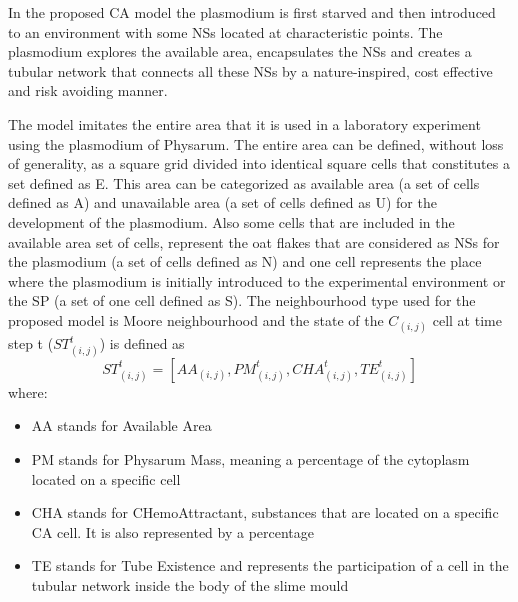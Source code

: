 In the proposed CA model \cite{Tsompanas2016} the plasmodium is first starved and then introduced to an environment with some NSs located at characteristic points. The plasmodium explores the available area, encapsulates the NSs and creates a tubular network that connects all these NSs by a nature-inspired, cost effective and risk avoiding manner.
\par
The model imitates the entire area that it is used in a laboratory experiment using the plasmodium of Physarum. The entire area can be defined, without loss of generality, as a square grid divided into identical square cells that constitutes a set defined as E. This area can be categorized as available area (a set of cells defined as A) and unavailable area (a set of cells defined as U) for the development of the plasmodium.
Also some cells that are included in the available area set of cells, represent the oat flakes that are considered as NSs for the plasmodium (a set of cells defined as N) and one cell represents the place where the plasmodium is initially introduced to the
experimental environment or the SP (a set of one cell defined as S). 
The neighbourhood type used for the proposed model is Moore neighbourhood and the state of the $C_{(i, j)}$ cell at time step t ($ ST^t_{(i, j)}$) is defined as \[ST^t_{(i, j)} = [AA_{(i, j)}, PM^t_{(i, j)}, CHA^t_{(i, j)}, TE^t_{(i, j)}]\] where:
\begin{itemize}
\item AA stands for Available Area
\item PM stands for Physarum Mass, meaning a percentage of the cytoplasm located on a specific cell
\item CHA stands for CHemoAttractant, substances that are located on a specific CA cell. It is also represented by a percentage
\item TE stands for Tube Existence and represents the participation of a cell in the tubular network inside the body of the slime mould
\end{itemize}